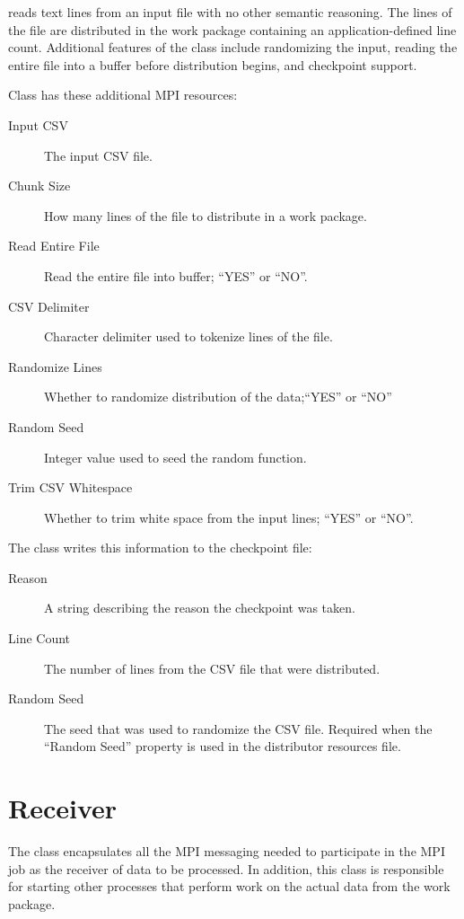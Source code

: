  reads text lines from an input file with no other
semantic reasoning. The lines of the file are distributed in the work package
containing an application-defined line count. Additional features of the
 class include randomizing the input, reading the entire
file into a buffer before distribution begins, and checkpoint support.

Class  has these additional MPI resources:
\begin{description}
\item[Input CSV] The input CSV file.
\item[Chunk Size] How many lines of the file to distribute in a work package.
\item[Read Entire File] Read the entire file into buffer; ``YES'' or ``NO''.
\item[CSV Delimiter] Character delimiter used to tokenize lines of the file.
\item[Randomize Lines] Whether to randomize distribution of the data;``YES''
or ``NO''
\item[Random Seed] Integer value used to seed the random function.
\item[Trim CSV Whitespace] Whether to trim white space from the input lines;
``YES'' or ``NO''.
\end{description}

The  class writes this information to the
checkpoint file:
\begin{description}
\item[Reason] A string describing the reason the checkpoint was taken.
\item[Line Count] The number of lines from the CSV file that were distributed.
\item[Random Seed] The seed that was used to randomize the CSV file. Required
when the ``Random Seed'' property is used in the distributor resources file.
\end{description}

\section{Receiver}
\label{sec-workpackagereceiver}

The  class encapsulates all the MPI messaging needed to
participate in the MPI job as the receiver of data to be processed. In
addition, this class is responsible for starting other processes that
perform work on the actual data from the work package.


